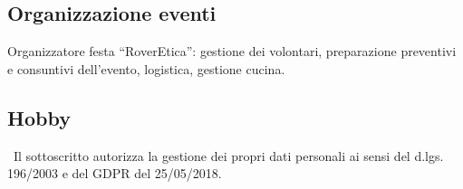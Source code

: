 \documentclass[12pt,a4paper,sans]{moderncv} %
\begin{document}
\subsection{Organizzazione eventi}
Organizzatore festa “RoverEtica”: gestione dei volontari, preparazione preventivi e consuntivi dell’evento, logistica, gestione cucina.
\subsection{Hobby}
%

\
Il sottoscritto autorizza la gestione dei propri dati personali ai sensi del d.lgs. 196/2003 e del GDPR del 25/05/2018.
\end{document}
